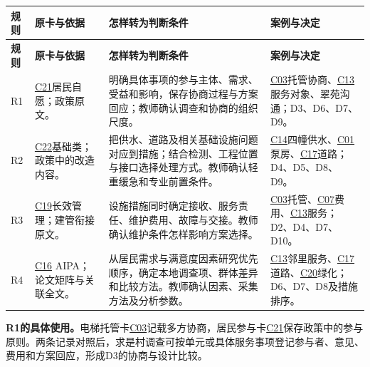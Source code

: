 \documentclass[UTF8,11pt,fontset=windows]{ctexart}
\begin{document}
\begin{longtable}{@{}L{12mm}L{37mm}L{64mm}L{40mm}@{}}
\toprule
\textbf{规则} & \textbf{原卡与依据} & \textbf{怎样转为判断条件} & \textbf{案例与决定}\\
\midrule
\endfirsthead
\toprule
\textbf{规则} & \textbf{原卡与依据} & \textbf{怎样转为判断条件} & \textbf{案例与决定}\\
\midrule
\endhead
R1 & \hyperlink{EXP-c48118fa-9af5-4f9a-a634-ae276701cc6a}{C21}居民自愿；政策原文。 & 明确具体事项的参与主体、需求、受益和影响，保存协商过程与方案回应；教师确认调查和协商的组织尺度。 & \hyperlink{EXP-1f50f306-64e5-4335-be56-5c89531c00f2}{C03}托管协商、\hyperlink{EXP-8ab942a8-bdac-4075-97da-46b09ee9aa41}{C13}服务对象、翠苑沟通；D3、D6、D7、D9。\\
R2 & \hyperlink{EXP-e1688c4c-a449-48d4-9d16-38fea3ca845e}{C22}基础类；政策中的改造内容。 & 把供水、道路及相关基础设施问题对应到措施；结合检测、工程位置与接口选择处理方式。教师确认轻重缓急和专业前置条件。 & \hyperlink{EXP-8fb43037-0680-4136-8844-edcb789391f4}{C14}四幢供水、\hyperlink{EXP-16120dfe-9d94-4394-8880-494b385cf2d2}{C01}泵房、\hyperlink{EXP-4fb5ae8b-4f8c-4b38-9f15-7fd612098a66}{C17}道路；D4、D5、D8、D9。\\
R3 & \hyperlink{EXP-6baff473-93ed-4160-9a93-a0abf3c7b092}{C19}长效管理；建管衔接原文。 & 设施措施同时确定接收、服务责任、维护费用、故障与交接。教师确认维护条件怎样影响方案选择。 & \hyperlink{EXP-1f50f306-64e5-4335-be56-5c89531c00f2}{C03}托管、\hyperlink{EXP-3092f687-50c6-452e-b1d1-5703c250c25e}{C07}费用、\hyperlink{EXP-8ab942a8-bdac-4075-97da-46b09ee9aa41}{C13}服务；D2、D4、D7、D10。\\
R4 & \hyperlink{EXP-2c88cc20-e2d3-4a32-a176-e48d753a4712}{C16} AIPA；论文矩阵与关联全文。 & 从居民需求与满意度因素研究优先顺序，确定本地调查项、群体差异和比较方法。教师确认因素、采集方法及分析参数。 & \hyperlink{EXP-8ab942a8-bdac-4075-97da-46b09ee9aa41}{C13}邻里服务、\hyperlink{EXP-4fb5ae8b-4f8c-4b38-9f15-7fd612098a66}{C17}道路、\hyperlink{EXP-825f931a-a8d3-49c2-9c42-e73bea9922e6}{C20}绿化；D6、D7、D8及措施排序。\\
\bottomrule
\end{longtable}

\textbf{R1的具体使用。}电梯托管卡\hyperlink{EXP-1f50f306-64e5-4335-be56-5c89531c00f2}{C03}记载多方协商，居民参与卡\hyperlink{EXP-c48118fa-9af5-4f9a-a634-ae276701cc6a}{C21}保存政策中的参与原则。两条记录对照后，求是村调查可按单元或具体服务事项登记参与者、意见、费用和方案回应，形成D3的协商与设计比较。\cite{trust,policy}
\end{document}
